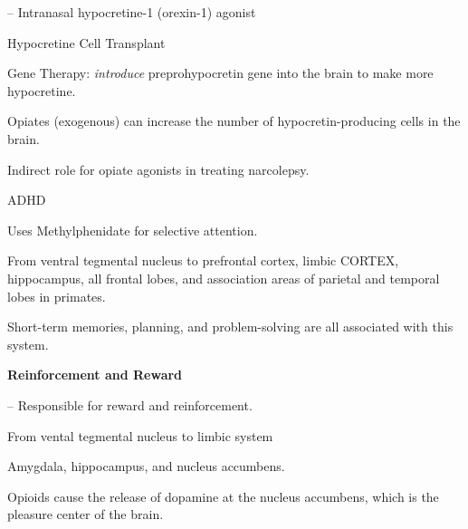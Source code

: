 \begin{coloredlist}
\begin{coloredlist}
\begin{coloredlist}
\begin{coloredlist}
                \item {} -- Intranasal hypocretine-1 (orexin-1) agonist
                \item Hypocretine Cell Transplant
                \item Gene Therapy: \textit{introduce} preprohypocretin gene into the brain to make more hypocretine.
                \item Opiates (exogenous) can increase the number of hypocretin-producing cells in the brain.
                \item Indirect role for opiate agonists in treating narcolepsy.
            \end{coloredlist}            
        \end{coloredlist}
        \item ADHD
        \begin{coloredlist}
            \item Uses Methylphenidate for selective attention.
        \end{coloredlist}
        \item {}
        \begin{coloredlist}
            \item From ventral tegmental nucleus to prefrontal cortex, limbic CORTEX, hippocampus, all frontal lobes, and association areas of parietal and temporal lobes in primates.
            \item Short-term memories, planning, and problem-solving are all associated with this system.
        \end{coloredlist}
    \end{coloredlist}
    \item \textbf{Reinforcement and Reward}
    \begin{coloredlist}
        \item {} -- Responsible for reward and reinforcement.
        \begin{coloredlist}
            \item From vental tegmental nucleus to limbic system
            \begin{coloredlist}
                \item Amygdala, hippocampus, and nucleus accumbens.
                \item Opioids cause the release of dopamine at the nucleus accumbens, which is the pleasure center of the brain.
            \end{coloredlist}

\end{coloredlist}
\end{coloredlist}
\end{coloredlist}
